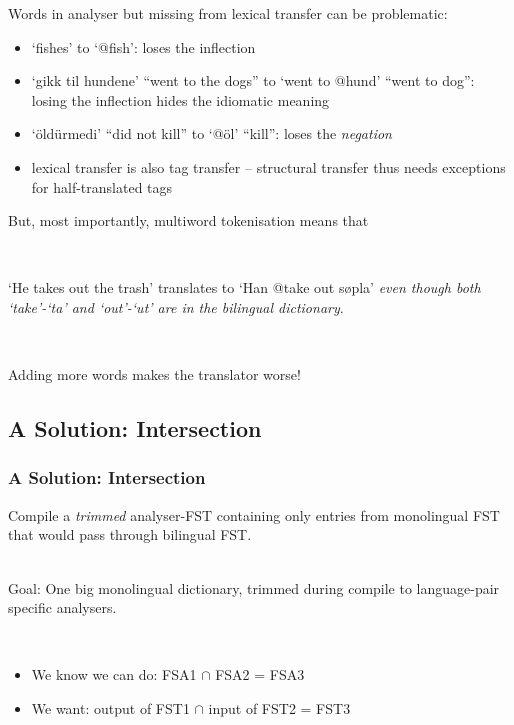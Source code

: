 \documentclass[notes=hide]{beamer}
\newcommand{\form}[1]{`#1'}
\begin{document}
\begin{frame}
  Words in analyser but missing from lexical transfer can be
  problematic:
  \begin{itemize}
  \item \form{fishes} to \form{@fish}: loses the inflection
  \item \form{gikk til hundene} ``went to the dogs'' to
    \form{went to @hund} ``went to dog'': losing the
    inflection hides the idiomatic meaning
  \item \form{öldürmedi} ``did not kill'' to \form{@öl} ``kill'':
    loses the \emph{negation}
  \item lexical transfer is also tag transfer – structural transfer
    thus needs exceptions for half-translated tags
  \end{itemize}
\end{frame}

\begin{frame}
  But, most importantly, multiword tokenisation means that

  ~

  \form{He takes out the trash} translates to \form{Han @take out
    søpla} \emph{even though both \form{take}-\form{ta} and
    \form{out}-\form{ut} are in the bilingual dictionary}.

  ~

  Adding more words makes the translator worse!
\end{frame}

\subsection{A Solution: Intersection}
\begin{frame}
  \frametitle{A Solution: Intersection}
  Compile a \emph{trimmed} analyser-FST containing only entries from
  monolingual FST that would pass through bilingual FST.

  ~\\

  Goal: One big monolingual dictionary, trimmed during compile to
  language-pair specific analysers.

  ~\\

  \begin{itemize}
  \item We know we can do: FSA1 $\cap$ FSA2 = FSA3
  \item We want: output of FST1 $\cap$ input of FST2 = FST3
  \end{itemize}

\end{frame}
\end{document}
